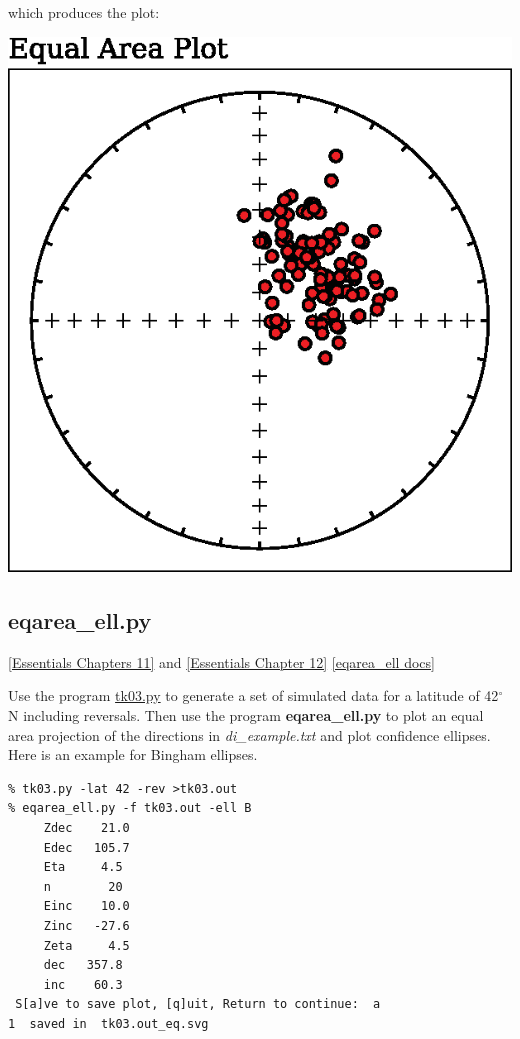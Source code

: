 \documentclass[11pt]{book}
\begin{document}
{{{\noindent
which produces the plot:

\includegraphics[width=12 cm]{EPSfiles/eqarea.eps}

\subsection{eqarea\_ell.py}
\href{http://magician.ucsd.edu/Essentials_2/WebBook2ch11.html#ch11}{ [Essentials Chapters 11]} and \href{http://magician.ucsd.edu/Essentials_2/WebBook2ch12.html#ch12}{ [Essentials Chapter 12]}
\href{http://earthref.org/PmagPy/pmagpydocs/eqarea_ell-module.html}{[eqarea\_ell docs]}

Use the program \href{#tk03.py}{tk03.py} to generate a set of simulated data for a latitude of 42$^{\circ}$N including reversals.  
Then use the program {\bf eqarea\_ell.py} to 
plot an equal area projection of the directions in {\it di\_example.txt} and plot confidence ellipses.  Here is an example for
Bingham ellipses.  


\begin{verbatim}
% tk03.py -lat 42 -rev >tk03.out
% eqarea_ell.py -f tk03.out -ell B
     Zdec    21.0
     Edec   105.7
     Eta     4.5
     n        20
     Einc    10.0
     Zinc   -27.6
     Zeta     4.5
     dec   357.8
     inc    60.3
 S[a]ve to save plot, [q]uit, Return to continue:  a
1  saved in  tk03.out_eq.svg
\end{verbatim}

}}}
\end{document}
